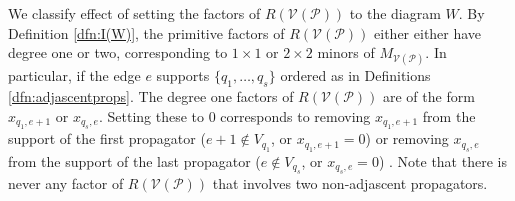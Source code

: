 \documentclass[11pt]{article}
\newcommand{\drawWLD}[2]{

\pgfmathsetmacro{\n}{#1}
\pgfmathsetmacro{\radius}{#2}
\pgfmathsetmacro{\angle}{360/\n}
\draw (0,0) circle (\radius);
    \foreach \i in {1,2,...,\n} {
      \draw (\angle*\i:\radius) node {$\bullet$};
    }

}
\newcommand{\drawprop}[4]{
\pgfmathsetmacro{\r}{#1}
\pgfmathsetmacro{\bumpr}{#2}
\pgfmathsetmacro{\s}{#3}
\pgfmathsetmacro{\bumps}{#4}
\pgfmathsetmacro{\perturbe}{\angle/\n}
\begin{scope}
\draw[smallpropagator] (\angle*\r + \angle/2 + \bumpr*\perturbe:\radius) -- (\angle*\s + \angle/2 + \bumps*\perturbe:\radius);
\end{scope}
}
\newcommand{\modifiedprop}[5]{
\pgfmathsetmacro{\r}{#1}
\pgfmathsetmacro{\bumpr}{#2}
\pgfmathsetmacro{\s}{#3}
\pgfmathsetmacro{\bumps}{#4}
\pgfmathsetmacro{\perturbe}{\angle/\n}

\begin{scope}
\clip (\angle*\r:\radius) -- (\angle + \angle*\r:\radius) -- (\angle*\s:\radius) -- (\angle + \angle*\s:\radius) -- (\angle*\r:\radius);
\draw[#5] (\angle*\r + \angle/2 + \bumpr*\perturbe:\radius) -- (\angle*\s + \angle/2 + \bumps*\perturbe:\radius);
\end{scope}
}
\newcommand{\boundaryprop}[4]{
\pgfmathsetmacro{\r}{#1}
\pgfmathsetmacro{\bumpr}{#2}
\pgfmathsetmacro{\s}{#3}
\pgfmathsetmacro{\perturbe}{\angle/\n}

\begin{scope}
\clip (\angle*\r:\radius) -- (\angle + \angle*\r:\radius) -- (\angle*\s - \angle:\radius) -- (\angle*\s:\radius) -- (\angle + \angle*\s:\radius) -- (\angle*\r:\radius);
\draw[#4] (\angle*\r + \angle/2 + \bumpr*\perturbe:\radius) -- (\angle*\s:\radius);
\end{scope}
	
}
\newcommand{\drawnumbers}{
  \foreach \i in {1,2,...,\n} {
  \pgfmathsetmacro{\x}{\angle*\i}
  \draw (\x:\radius*1.25) node {\footnotesize \i};
}
}
\def\bas #1\eas{\begin{align*} #1 \end{align*}}
\newcommand{\cP}{\mathcal{P}}
\newcommand{\cV}{\mathcal{V}}
\newcommand{\VP}{\cV(\cP)}
\theoremstyle{remark}
\theoremstyle{definition}
\begin{document}
We classify effect of setting the factors of $R(\VP)$ to the diagram $W$. By Definition \ref{dfn:I(W)}, the primitive factors of $R(\VP)$ either either have degree one or two, corresponding to $1 \times 1$ or $2 \times 2$ minors of $M_{\VP}$. In particular, if the edge $e$ supports $\{q_1, \ldots, q_s\}$ ordered as in Definitions \ref{dfn:adjascentprops}. The degree one factors of $R(\VP)$ are of the form  $x_{q_1, e+1}$ or $x_{q_s, e}$. Setting these to $0$ corresponds to removing $x_{q_1, e+1}$ from the support of the first propagator ($e+1 \not \in V_{q_1}$, or $x_{q_1, e+1} = 0 $) or removing $x_{q_s, e}$ from the support of the last propagator ($e \not \in V_{q_s}$, or $x_{q_s, e} = 0 $) . Note that there is never any factor of $R(\VP)$ that involves two non-adjascent propagators. %

\begin{comment}
\bas   \begin{tikzpicture}[rotate=67.5,baseline=(current bounding box.east)]
	\begin{scope}
	\drawWLD{10}{1.5}
	\drawnumbers
	\boundaryprop{1}{0}{9}{propagator, dashed}
	\drawprop{3}{0}{8}{0}
        \drawprop{5}{0}{8}{-1}
		\end{scope}
	\end{tikzpicture} \text{ or } \begin{tikzpicture}[rotate=67.5,baseline=(current bounding box.east)]
	\begin{scope}
	\drawWLD{10}{1.5}
	\drawnumbers
	\drawprop{1}{0}{8}{1}
	\drawprop{3}{0}{8}{0}
        \boundaryprop{5}{0}{8}{propagator, dashed}
		\end{scope}
	\end{tikzpicture} \;.\eas Note that unless there is exactly one propagator adjascent on an edge, there is at most ever one variable corresponding to that edge that is a factor of $R(\VP)$. 

Similarly, the degree two factors corresponds to setting two pairs of variables, ($x_{q_i, e} , x_{q_i e+1}$) and ($x_{q_{i+1}, e} , x_{q_{i+1}, e+1}$), precicely those supporting adjasacent propagators on an edge, as scalar multiples of each other. Diagramatically, we depict this as  we draw this by making two adjascent propagators meet on the common edge. Again, from display \eqref{eq:relevantexample}, with $e = 8$, \bas   \begin{tikzpicture}[rotate=67.5,baseline=(current bounding box.east)]
	\begin{scope}
	\drawWLD{10}{1.5}
	\drawnumbers
	\modifiedprop{1}{0}{8}{2}{propagator, dashed}
	\modifiedprop{3}{0}{8}{2}{propagator, dashed}
        \drawprop{5}{0}{8}{-1}
		\end{scope}
	\end{tikzpicture} \;.\eas.    \todo{is the diagramatics actualy useful here?}
\end{comment}
\end{document}
